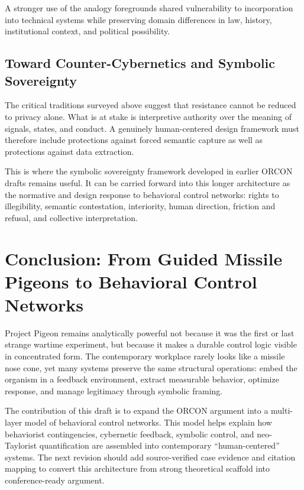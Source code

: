\documentclass[11pt, a4paper]{article}
\begin{document}
A stronger use of the analogy foregrounds shared vulnerability to incorporation into technical systems while preserving domain differences in law, history, institutional context, and political possibility.

\subsection{Toward Counter-Cybernetics and Symbolic Sovereignty}
The critical traditions surveyed above suggest that resistance cannot be reduced to privacy alone. What is at stake is interpretive authority over the meaning of signals, states, and conduct. A genuinely human-centered design framework must therefore include protections against forced semantic capture as well as protections against data extraction.

This is where the symbolic sovereignty framework developed in earlier ORCON drafts remains useful. It can be carried forward into this longer architecture as the normative and design response to behavioral control networks: rights to illegibility, semantic contestation, interiority, human direction, friction and refusal, and collective interpretation.

\section{Conclusion: From Guided Missile Pigeons to Behavioral Control Networks}
Project Pigeon remains analytically powerful not because it was the first or last strange wartime experiment, but because it makes a durable control logic visible in concentrated form. The contemporary workplace rarely looks like a missile nose cone, yet many systems preserve the same structural operations: embed the organism in a feedback environment, extract measurable behavior, optimize response, and manage legitimacy through symbolic framing.

The contribution of this draft is to expand the ORCON argument into a multi-layer model of behavioral control networks. This model helps explain how behaviorist contingencies, cybernetic feedback, symbolic control, and neo-Taylorist quantification are assembled into contemporary ``human-centered'' systems. The next revision should add source-verified case evidence and citation mapping to convert this architecture from strong theoretical scaffold into conference-ready argument.
\end{document}
